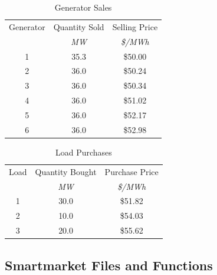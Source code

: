\documentclass[12pt]{article}
\numberwithin{equation}{section}
\numberwithin{table}{section}
\numberwithin{figure}{section}
\begin{document}
\begin{appendices}
\begin{table}[!ht]
\centering
\begin{threeparttable}
\caption{Generator Sales}
\label{tab:sales}
\footnotesize
\begin{tabular}{ccc}
\toprule
Generator & Quantity Sold & Selling Price \\
 & {\footnotesize \it MW} & {\footnotesize \it \$/MWh} \\
\midrule
1	& 35.3	& \$50.00 \\
2	& 36.0	& \$50.24 \\
3	& 36.0	& \$50.34 \\
4	& 36.0	& \$51.02 \\
5	& 36.0	& \$52.17 \\
6	& 36.0	& \$52.98 \\
\bottomrule
\end{tabular}
\end{threeparttable}
\end{table}

\begin{table}[!ht]
\centering
\begin{threeparttable}
\caption{Load Purchases}
\label{tab:purchases}
\footnotesize
\begin{tabular}{ccc}
\toprule
Load & Quantity Bought & Purchase Price \\
 & {\footnotesize \it MW} & {\footnotesize \it \$/MWh} \\
\midrule
1	& 30.0	& \$51.82 \\
2	& 10.0	& \$54.03 \\
3	& 20.0	& \$55.62 \\
\bottomrule
\end{tabular}
\end{threeparttable}
\end{table}

\subsection{Smartmarket Files and Functions}


\end{appendices}
\end{document}
